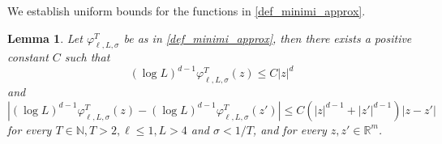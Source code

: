 \documentclass{article}
\theoremstyle{plain}
\newtheorem{lemma}[theorem]{Lemma}
\theoremstyle{definition}
\def\rr{{\mathbb R}}
\def\NN{{\mathbb N}}
\newcommand{\f}{\varphi}
\newcommand{\s}{\sigma}
\numberwithin{equation}{section}
\begin{document}
We establish uniform bounds for the functions in \eqref{def_minimi_approx}.

\begin{lemma} Let $\f^T_{\ell,L,\sigma}$ be as in \eqref{def_minimi_approx}, then there exists a positive constant $C$ such that
\begin{equation}
\label{crescita_minimi_discreti}
    (\log L)^{d-1}\f_{\ell,L,\s}^T(z)\leq C|z|^d
\end{equation}
and
\begin{equation}
\label{equilip_minimi_discreti}
    |(\log L)^{d-1}\f_{\ell,L,\s}^T(z)-(\log L)^{d-1}\f_{\ell,L,\s}^T(z')|\leq C(|z|^{d-1}+|z'|^{d-1})|z-z'|
\end{equation}
for every $T\in\NN,T>2, \ell\leq1,L>4$ and $\s < 1/T$, and for every $z,z'\in \rr^m$. 
\end{lemma}
\end{document}
